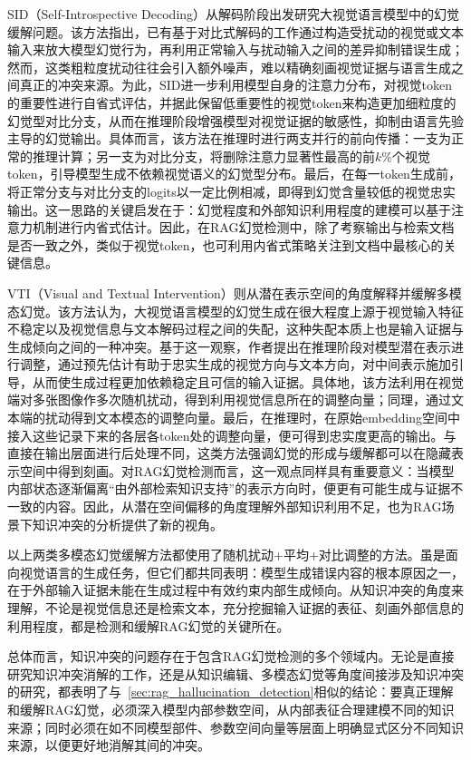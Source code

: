 SID（Self-Introspective Decoding）\cite{li2025self}从解码阶段出发研究大视觉语言模型中的幻觉缓解问题。该方法指出，已有基于对比式解码的工作通过构造受扰动的视觉或文本输入来放大模型幻觉行为，再利用正常输入与扰动输入之间的差异抑制错误生成；然而，这类粗粒度扰动往往会引入额外噪声，难以精确刻画视觉证据与语言生成之间真正的冲突来源。为此，SID进一步利用模型自身的注意力分布，对视觉token的重要性进行自省式评估，并据此保留低重要性的视觉token来构造更加细粒度的幻觉型对比分支，从而在推理阶段增强模型对视觉证据的敏感性，抑制由语言先验主导的幻觉输出。具体而言，该方法在推理时进行两支并行的前向传播：一支为正常的推理计算；另一支为对比分支，将删除注意力显著性最高的前$k\%$个视觉token，引导模型生成不依赖视觉语义的幻觉型分布。最后，在每一token生成前，将正常分支与对比分支的logits以一定比例相减，即得到幻觉含量较低的视觉忠实输出。这一思路的关键启发在于：幻觉程度和外部知识利用程度的建模可以基于注意力机制进行内省式估计。因此，在RAG幻觉检测中，除了考察输出与检索文档是否一致之外，类似于视觉token，也可利用内省式策略关注到文档中最核心的关键信息。

VTI（Visual and Textual Intervention）\cite{liu2025reducing}则从潜在表示空间的角度解释并缓解多模态幻觉。该方法认为，大视觉语言模型的幻觉生成在很大程度上源于视觉输入特征不稳定以及视觉信息与文本解码过程之间的失配，这种失配本质上也是输入证据与生成倾向之间的一种冲突。基于这一观察，作者提出在推理阶段对模型潜在表示进行调整，通过预先估计有助于忠实生成的视觉方向与文本方向，对中间表示施加引导，从而使生成过程更加依赖稳定且可信的输入证据。具体地，该方法利用在视觉端对多张图像作多次随机扰动，得到利用视觉信息所在的调整向量；同理，通过文本端的扰动得到文本模态的调整向量。最后，在推理时，在原始embedding空间中接入这些记录下来的各层各token处的调整向量，便可得到忠实度更高的输出。与直接在输出层面进行后处理不同，这类方法强调幻觉的形成与缓解都可以在隐藏表示空间中得到刻画。对RAG幻觉检测而言，这一观点同样具有重要意义：当模型内部状态逐渐偏离“由外部检索知识支持”的表示方向时，便更有可能生成与证据不一致的内容。因此，从潜在空间偏移的角度理解外部知识利用不足，也为RAG场景下知识冲突的分析提供了新的视角。

以上两类多模态幻觉缓解方法都使用了随机扰动+平均+对比调整的方法。虽是面向视觉语言的生成任务，但它们都共同表明：模型生成错误内容的根本原因之一，在于外部输入证据未能在生成过程中有效约束内部生成倾向。从知识冲突的角度来理解，不论是视觉信息还是检索文本，充分挖掘输入证据的表征、刻画外部信息的利用程度，都是检测和缓解RAG幻觉的关键所在。

总体而言，知识冲突的问题存在于包含RAG幻觉检测的多个领域内。无论是直接研究知识冲突消解的工作，还是从知识编辑、多模态幻觉等角度间接涉及知识冲突的研究，都表明了与~\ref{sec:rag_hallucination_detection}相似的结论：要真正理解和缓解RAG幻觉，必须深入模型内部参数空间，从内部表征合理建模不同的知识来源；同时必须在如不同模型部件、参数空间向量等层面上明确显式区分不同知识来源，以便更好地消解其间的冲突。

